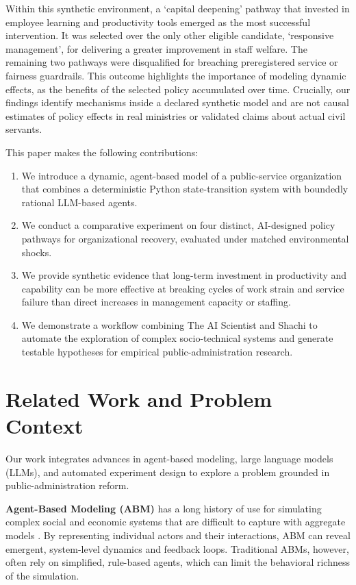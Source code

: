 \documentclass{article}
\begin{document}
Within this synthetic environment, a `capital deepening' pathway that invested in employee learning and productivity tools emerged as the most successful intervention. It was selected over the only other eligible candidate, `responsive management', for delivering a greater improvement in staff welfare. The remaining two pathways were disqualified for breaching preregistered service or fairness guardrails. This outcome highlights the importance of modeling dynamic effects, as the benefits of the selected policy accumulated over time. Crucially, our findings identify mechanisms inside a declared synthetic model and are not causal estimates of policy effects in real ministries or validated claims about actual civil servants.

This paper makes the following contributions:
\begin{enumerate}
    \item We introduce a dynamic, agent-based model of a public-service organization that combines a deterministic Python state-transition system with boundedly rational LLM-based agents.
    \item We conduct a comparative experiment on four distinct, AI-designed policy pathways for organizational recovery, evaluated under matched environmental shocks.
    \item We provide synthetic evidence that long-term investment in productivity and capability can be more effective at breaking cycles of work strain and service failure than direct increases in management capacity or staffing.
    \item We demonstrate a workflow combining The AI Scientist and Shachi to automate the exploration of complex socio-technical systems and generate testable hypotheses for empirical public-administration research.
\end{enumerate}

\section{Related Work and Problem Context}
Our work integrates advances in agent-based modeling, large language models (LLMs), and automated experiment design to explore a problem grounded in public-administration reform.

\textbf{Agent-Based Modeling (ABM)} has a long history of use for simulating complex social and economic systems that are difficult to capture with aggregate models \citep{bonabeau2002abm}. By representing individual actors and their interactions, ABM can reveal emergent, system-level dynamics and feedback loops. Traditional ABMs, however, often rely on simplified, rule-based agents, which can limit the behavioral richness of the simulation.
\end{document}
